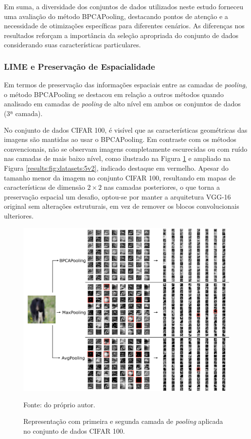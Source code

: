 Em suma, a diversidade dos conjuntos de dados utilizados neste estudo forneceu uma avaliação do método BPCAPooling, destacando pontos de atenção e a necessidade de otimizações específicas para diferentes cenários. As diferenças nos resultados reforçam a importância da seleção apropriada do conjunto de dados considerando suas características particulares.

\subsubsection{LIME e Preservação de Espacialidade}
\label{results:class:lime}
Em termos de preservação das informações espaciais entre as camadas de \textit{pooling}, o método BPCAPooling se destacou em relação a outros métodos quando analisado em camadas de \textit{pooling} de alto nível em ambos os conjuntos de dados (3ª camada).

No conjunto de dados CIFAR 100, é visível que as características geométricas das imagens são mantidas ao usar o BPCAPooling. Em contraste com os métodos convencionais, não se observam imagens completamente escurecidas ou com ruído nas camadas de mais baixo nível, como ilustrado na Figura \ref{results:fig:datasets:5} e ampliado na Figura \ref{results:fig:datasets:5v2}, indicado destaque em vermelho. Apesar do tamanho menor da imagem no conjunto CIFAR 100, resultando em mapas de características de dimensão $2 \times 2$ nas camadas posteriores, o que torna a preservação espacial um desafio, optou-se por manter a arquitetura VGG-16 original sem alterações estruturais, em vez de remover os blocos convolucionais ulteriores.

\begin{figure}[H]
    \centering
    \caption{Representação com primeira e segunda camada de \textit{pooling} aplicada no conjunto de dados CIFAR 100.}
    \label{results:fig:datasets:5}
    \includegraphics[width=1\textwidth]{recursos/imagens/results/cifar_blocks.png}

    Fonte: do próprio autor.
\end{figure}

